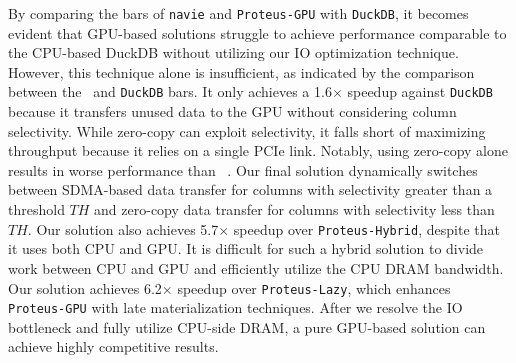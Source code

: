 By comparing the bars of \texttt{navie} and \texttt{Proteus-GPU} with \texttt{DuckDB}, it becomes evident that GPU-based solutions struggle to achieve performance comparable to the CPU-based DuckDB without utilizing our IO optimization technique. 
However, this technique alone is insufficient, as indicated by the comparison between the \THISWORK\ and \texttt{DuckDB} bars. 
It only achieves a 1.6$\times$ speedup against \texttt{DuckDB} because it transfers unused data to the GPU without considering column selectivity. 
While zero-copy can exploit selectivity, it falls short of maximizing throughput because it relies on a single PCIe link. 
Notably, using zero-copy alone results in worse performance than \THISWORK\ .
Our final solution dynamically switches between SDMA-based data transfer for columns with selectivity greater than a threshold \(TH\) and zero-copy data transfer for columns with selectivity less than \(TH\).
Our solution also achieves 5.7$\times$ speedup over \texttt{Proteus-Hybrid}, despite that it uses both CPU and GPU.
It is difficult for such a hybrid solution to divide work between CPU and GPU and efficiently utilize the CPU DRAM bandwidth.
Our solution achieves 6.2$\times$ speedup over \texttt{Proteus-Lazy}, which enhances \texttt{Proteus-GPU} with late materialization techniques.
After we resolve the IO bottleneck and fully utilize CPU-side DRAM, a pure GPU-based solution can achieve highly competitive results.


\begin{comment}
Figure~\ref{fig:ssb-perf} shows the comparison of SSB query performance between our solution and the baselines.
On average, our solution achieves 3.4$\times$ speedup over DuckDB, with all the data fetched from CPU DRAM on the fly.
Broken down into each query flight, the speedup is 2.4$\times$ for Q1.*, 3.6$\times$ for Q2.*, 3.9$\times$ for Q3.* and 3.7$\times$ for Q4.*.
More speedup is observed in Q2.*, Q3.*, and Q4.* because they include more complicated multi-way joins.

By comparing the bars of \texttt{navie} and \texttt{Proteus-GPU} with \texttt{DuckDB}, note that GPU-based solutions fail to achieve comparable performance to CPU-based DuckDB without using our IO redistribution technique.
However, this technique only is not enough, as we can see by comparing the bars of \texttt{GPU-IO} with \texttt{DuckDB}. 
It only achieves a 1.6$\times$ speedup against DuckDB, as it transfers unused data to GPU ignoring columns' selectivity.
While we can use zero-copy to exploit selectivity, it fails short in maximum throughput because it only uses one PCIe link.
We can notice that using zero-copy alone only delivers worse performance than \texttt{GPU-IO}.
Our final solution switches between SDMA-based data transfer for columns with selectivity larger than a threshold $TH$ and zero-copy data transfer for columns with selectivity lower than $TH$.
\end{comment}

